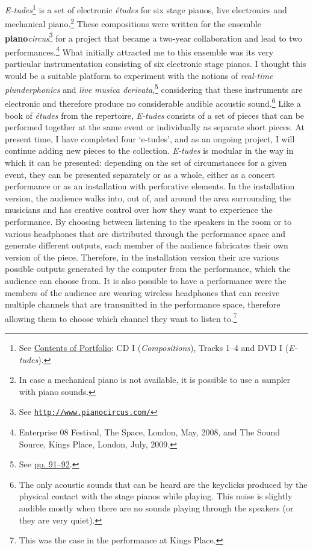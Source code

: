 \emph{E-tudes}\footnote{See \hyperlink{portfolio}{Contents of Portfolio}: CD I (\emph{Compositions}), Tracks 1--4 and DVD I (\emph{E-tudes}).} is a set of electronic \emph{\'{e}tudes} for six stage pianos, live electronics and mechanical piano.\footnote{In case a mechanical piano is not available, it is possible to use a sampler with piano sounds.} These compositions were written for the ensemble \textbf{piano}\emph{circus}\footnote{See \href{http://www.pianocircus.com/}{\texttt{http://www.pianocircus.com/}}} for a project that became a \mbox{two-year} collaboration and lead to two performances.\footnote{Enterprise 08 Festival, The Space, London, May, 2008, and The Sound Source, Kings Place, London, July, 2009.} What initially attracted me to this ensemble was its very particular instrumentation consisting of six electronic stage pianos. I thought this would be a suitable platform to experiment with the notions of \emph{real-time plunderphonics} and \emph{live musica derivata},\footnote{See \hyperlink{realtimeplunderfuck}{pp. 91--92}.} considering that these instruments are electronic and therefore produce no considerable audible acoustic sound.\footnote{The only acoustic sounds that can be heard are the keyclicks produced by the physical contact with the stage pianos while playing. This noise is slightly audible mostly when there are no sounds playing through the speakers (or they are very quiet).} Like a book of \emph{\'{e}tudes} from the repertoire, \emph{E-tudes} consists of a set of pieces that can be performed together at the same event or individually as separate short pieces. At present time, I have completed four `e-tudes', and as an ongoing project, I will continue adding new pieces to the collection. \emph{E-tudes} is modular in the way in which it can be presented: depending on the set of circumstances for a given event, they can be presented separately or as a whole, either as a concert performance or as an installation with perforative elements. In the installation version, the audience walks into, out of, and around the area surrounding the musicians and has creative control over how they want to experience the performance. By choosing between listening to the speakers in the room or to various headphones that are distributed through the performance space and generate different outputs, each member of the audience fabricates their own version of the piece. Therefore, in the installation version their are various possible outputs generated by the computer from the performance, which the audience can choose from. It is also possible to have a performance were the members of the audience are wearing wireless headphones that can receive multiple channels that are transmitted in the performance space, therefore allowing them to choose which channel they want to listen to.\footnote{This was the case in the performance at Kings Place.}

